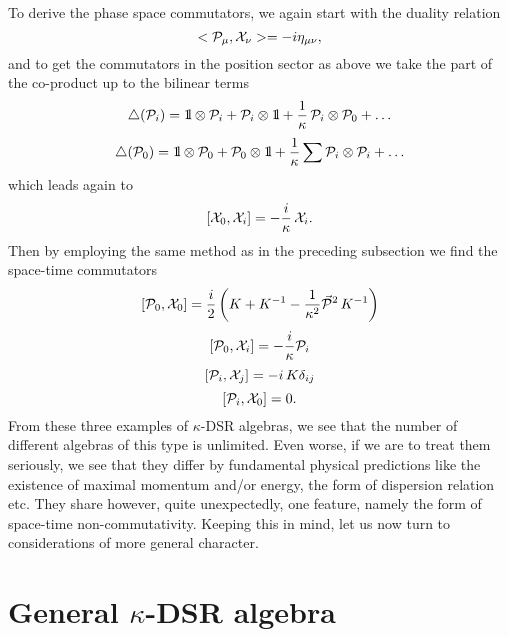 \documentclass [prd,twocolumn,nofootinbib,showpacs]  {revtex4}
\def\bbbone{{\mathchoice {\rm 1\mskip-4mu l} {\rm 1\mskip-4mu l}
{\rm 1\mskip-4.5mu l} {\rm 1\mskip-5mu l}}}
\begin{document}
To derive the phase space commutators, we again start with the duality relation
$$
 <{\cal P}_\mu, {\cal X}_\nu> =  -i \eta_{\mu\nu},
$$
and to get the commutators in the position sector as above we take
 the part of the co-product up to the bilinear terms
\begin{equation}\label{cpcb1}
  \triangle({\cal P}_{i})=\bbbone \otimes {\cal P}_{i} + {\cal P}_{i} \otimes \bbbone +
   {\frac{1}{\kappa}}\, {\cal P}_{i} \otimes {\cal P}_{0} + \ldots
\end{equation}
\begin{equation}\label{cpcb2}
  \triangle({\cal P}_{0})= \bbbone \otimes {\cal P}_{0} + {\cal P}_{0} \otimes \bbbone +
  \frac{1}{\kappa}\sum {\cal P}_{i}\otimes {\cal P}_{i}+ \ldots
\end{equation}
which leads again to
\begin{equation}\label{21}
  [{\cal X}_0, {\cal X}_i] = -\frac{i}\kappa\, {\cal X}_i.
\end{equation}
Then by employing the same method as in the preceding subsection
we find the space-time commutators
\begin{equation}\label{22a}
 [{\cal P}_0, {\cal X}_0] = \frac{i}2\left(K + K^{-1}- \frac1{\kappa^2}\vec{{\cal
    P}}{}^2\, K^{-1}\right)
\end{equation}
\begin{equation}\label{22b}
 [{\cal P}_0, {\cal X}_i] =  -\frac{i}\kappa {\cal P}_i
\end{equation}
\begin{equation}\label{22c}
  [{\cal P}_i, {\cal X}_j] = - i \, K\delta_{ij}
\end{equation}
\begin{equation}\label{22d}
 [{\cal P}_i, {\cal X}_0] = 0.
\end{equation}
From these three examples of $\kappa$-DSR algebras, we see that
the number of different  algebras of this type is unlimited. Even
worse, if we are to treat them seriously, we see that they differ
by fundamental physical predictions like the existence of maximal
momentum and/or energy, the form of dispersion relation etc. They
share however, quite unexpectedly, one feature, namely the form of
space-time non-commutativity. Keeping this in mind, let us now
turn to considerations of more general character.

\section{General $\kappa$-DSR algebra}
\end{document}
